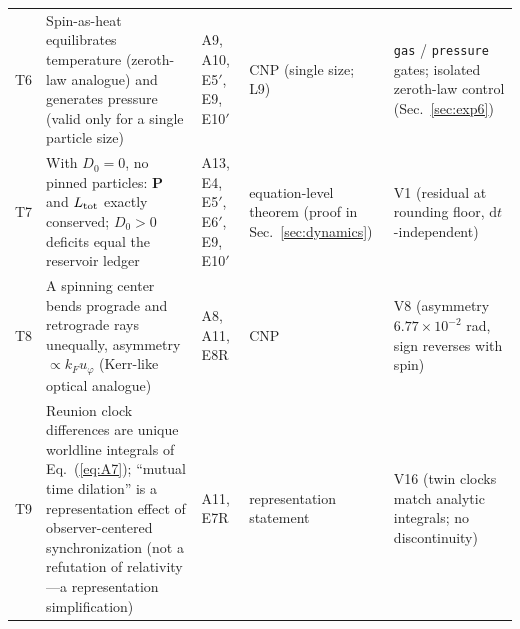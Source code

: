 \documentclass[aps,reprint,amsmath,amssymb,nofootinbib,superscriptaddress,floatfix]{revtex4-2}
\newcommand{\ud}{\mathrm{d}}
\newcommand{\vect}[1]{\bm{#1}}
\newcommand{\Dz}{D_0}
\begin{document}
\begin{table}[t]
\begin{ruledtabular}
\begin{tabular}{lp{}p{}p{}p{}}
T6 & Spin-as-heat equilibrates temperature (zeroth-law analogue)
and generates pressure (valid only for a single particle size) & A9,
A10,
E5$'$, E9, E10$'$ & CNP (single size; L9) & \texttt{gas} /
\texttt{pressure} gates; isolated zeroth-law control
(Sec.~\ref{sec:exp6}) \\
T7 & With $\Dz{=}0$, no pinned particles: $\vect{P}$ and
$L_{\rm tot}$ exactly conserved; $\Dz{>}0$ deficits equal the
reservoir ledger & A13, E4, E5$'$, E6$'$, E9, E10$'$ &
equation-level theorem (proof in Sec.~\ref{sec:dynamics}) & V1
(residual at rounding floor, $\ud t$-independent) \\
T8 & A spinning center bends prograde and retrograde rays
unequally, asymmetry $\propto k_F u_\varphi$ (Kerr-like optical
analogue) & A8, A11, E8R & CNP & V8 (asymmetry
$6.77\times10^{-2}$ rad, sign reverses with spin) \\
T9 & Reunion clock differences are unique worldline integrals of
Eq.~(\ref{eq:A7}); ``mutual time dilation'' is a representation
effect of observer-centered synchronization (not a refutation of
relativity---a representation simplification) & A11, E7R &
representation statement & V16 (twin clocks match analytic
integrals; no discontinuity) \\
\end{tabular}
\end{ruledtabular}
\end{table}
\end{document}
